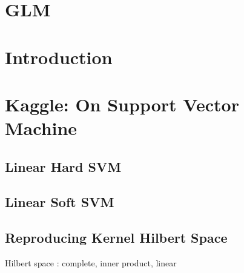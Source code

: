 \documentclass[12pt]{article}
\begin{document}
\pagebreak
\section*{GLM}
\setcounter{section}{0}
\bigskip

\section{Introduction}



\pagebreak

\section*{Kaggle: On Support Vector Machine}

\setcounter{section}{1}
\setcounter{subsection}{0}


\subsection{Linear Hard SVM}


\subsection{Linear Soft SVM}


\subsection{Reproducing Kernel Hilbert Space}

Hilbert space : complete, inner product, linear 
\end{document}

